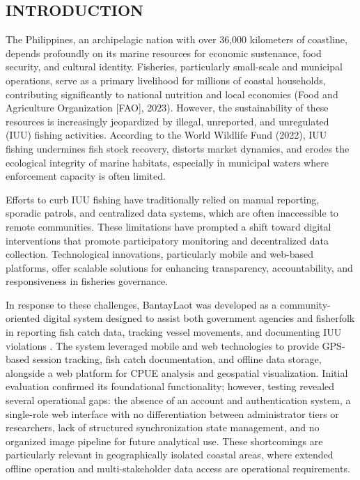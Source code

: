 \documentclass{icsthesis}
\begin{document}
	\begin{mainmatter}
		\section{INTRODUCTION}
			The Philippines, an archipelagic nation with over 36,000 kilometers of coastline, depends profoundly on its marine resources for economic sustenance, food security, and cultural identity. Fisheries, particularly small-scale and municipal operations, serve as a primary livelihood for millions of coastal households, contributing significantly to national nutrition and local economies (Food and Agriculture Organization [FAO], 2023). However, the sustainability of these resources is increasingly jeopardized by illegal, unreported, and unregulated (IUU) fishing activities. According to the World Wildlife Fund (2022), IUU fishing undermines fish stock recovery, distorts market dynamics, and erodes the ecological integrity of marine habitats, especially in municipal waters where enforcement capacity is often limited.

Efforts to curb IUU fishing have traditionally relied on manual reporting, sporadic patrols, and centralized data systems, which are often inaccessible to remote communities. These limitations have prompted a shift toward digital interventions that promote participatory monitoring and decentralized data collection. Technological innovations, particularly mobile and web-based platforms, offer scalable solutions for enhancing transparency, accountability, and responsiveness in fisheries governance.

In response to these challenges, BantayLaot was developed as a community-oriented digital system designed to assist both government agencies and fisherfolk in reporting fish catch data, tracking vessel movements, and documenting IUU violations \cite{Gallero2025}. The system leveraged mobile and web technologies to provide GPS-based session tracking, fish catch documentation, and offline data storage, alongside a web platform for CPUE analysis and geospatial visualization. Initial evaluation confirmed its foundational functionality; however, testing revealed several operational gaps: the absence of an account and authentication system, a single-role web interface with no differentiation between administrator tiers or researchers, lack of structured synchronization state management, and no organized image pipeline for future analytical use. These shortcomings are particularly relevant in geographically isolated coastal areas, where extended offline operation and multi-stakeholder data access are operational requirements.


\end{mainmatter}
\end{document}
